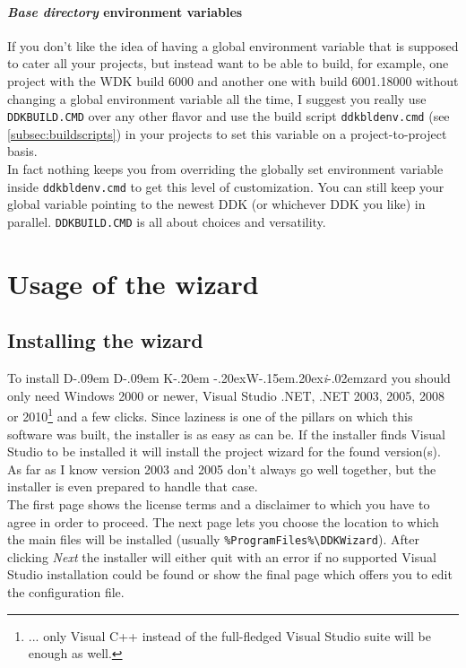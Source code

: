 \documentclass[a4paper,titlepage]{report}
\def\ddkwiz{D\kern-.09em D\kern-.09em K\kern-.20em \raise-.20ex\hbox{W}\kern-.15em\raise.20ex\hbox{\it{i}}\kern-.02em{zard}}
\begin{document}
\subsubsection{\emph{Base directory} environment variables}
\label{subsubsec:basedir}
If you don't like the idea of having a global environment variable that is supposed to cater all your
projects, but instead want to be able to build, for example, one project with the WDK build 6000 and
another one with build 6001.18000 without changing a global environment variable all the time, I suggest
you really use \texttt{DDKBUILD.CMD} over any other flavor and use the build script \texttt{ddkbldenv.cmd}
(see \autoref{subsec:buildscripts}) in your projects to set this variable on a project-to-project basis.\\
In fact nothing keeps you from overriding the globally set environment variable inside \texttt{ddkbldenv.cmd}
to get this level of customization. You can still keep your global variable pointing to the newest DDK (or
whichever DDK you like) in parallel. \texttt{DDKBUILD.CMD} is all about choices and versatility.

\chapter{Usage of the wizard}\thispagestyle{fancy}
\section{Installing the wizard}
To install \ddkwiz{} you should only need Windows 2000 or newer, Visual Studio .NET,
.NET 2003, 2005, 2008 or 2010\footnote{... only
Visual C++ instead of the full-fledged Visual Studio suite will be enough as well.}
and a few clicks. Since laziness is one of the pillars on which this software was
built, the installer is as easy as can be.
If the installer finds Visual Studio to be installed it will install the
project wizard for the found version(s). As far as I know version 2003 and 2005
don't always go well together, but the installer is even prepared to handle that case.\\

The first page shows the license terms and a disclaimer to which you have to agree
in order to proceed. The next page lets you choose the location to which the
main files will be installed (usually \verb+%ProgramFiles%\DDKWizard+). After
clicking \emph{Next} the installer will either quit with an error if no supported
Visual Studio installation could be found or show the final page which offers
you to edit the configuration file.\\
\end{document}
